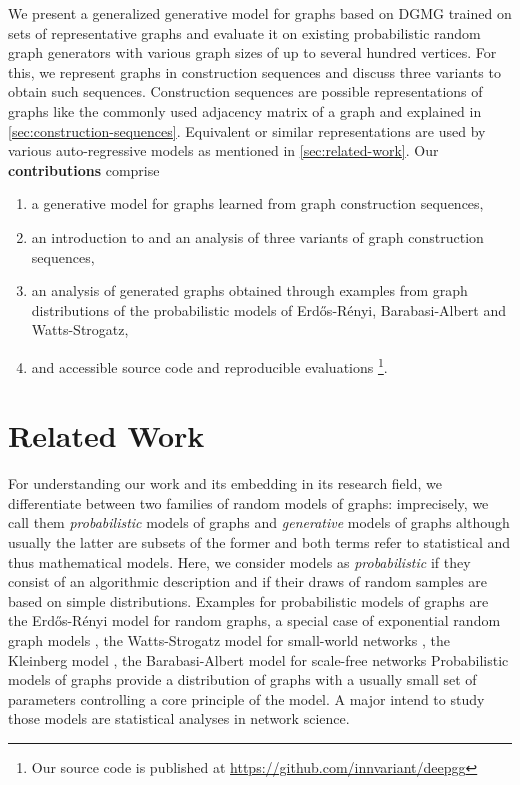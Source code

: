 \documentclass{article}
\begin{document}
We present a generalized generative model for graphs based on DGMG \cite{li2018learning} trained on sets of representative graphs and evaluate it on existing probabilistic random graph generators with various graph sizes of up to several hundred vertices.
For this, we represent graphs in construction sequences and discuss three variants to obtain such sequences.
Construction sequences are possible representations of graphs like the commonly used adjacency matrix of a graph and explained in \autoref{sec:construction-sequences}.
Equivalent or similar representations are used by various auto-regressive models as mentioned in \autoref{sec:related-work}.
Our \textbf{contributions} comprise
\begin{enumerate}
	\item a generative model for graphs learned from graph construction sequences,
	\item an introduction to and an analysis of three variants of graph construction sequences,
	\item an analysis of generated graphs obtained through examples from graph distributions of the probabilistic models of Erdős-Rényi, Barabasi-Albert and Watts-Strogatz,
	\item and accessible source code and reproducible evaluations \footnote{Our source code is published at \url{https://github.com/innvariant/deepgg}}.
\end{enumerate}
 \section{Related Work}\label{sec:related-work}
For understanding our work and its embedding in its research field, we differentiate between two families of random models of graphs:
imprecisely, we call them \textit{probabilistic} models of graphs and \textit{generative} models of graphs although usually the latter are subsets of the former and both terms refer to statistical and thus mathematical models.
Here, we consider models as \textit{probabilistic} if they consist of an algorithmic description and if their draws of random samples are based on simple distributions.
Examples for probabilistic models of graphs are the Erdős-Rényi model \cite{erdos1959random} for random graphs, a special case of exponential random graph models \cite{wasserman1996logit}, the Watts-Strogatz model for small-world networks \cite{watts1998collective}, the Kleinberg model \cite{kleinberg2000navigation}, the Barabasi-Albert model for scale-free networks \cite{albert2002statistical}
Probabilistic models of graphs provide a distribution of graphs with a usually small set of parameters controlling a core principle of the model.
A major intend to study those models are statistical analyses in network science.
\end{document}
